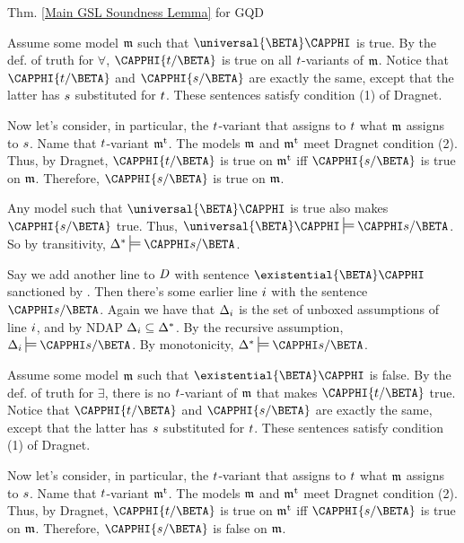 \begin{PROOFOF}{Thm. \ref{Main GSL Soundness Lemma} for GQD}
\begin{description}
\begin{description}
Assume some model $\mathfrak{m}$ such that $\universal{\BETA}\CAPPHI$ is true.  By the def. of truth for $\forall$, $\CAPPHI{\variable{t}/\BETA}$ is true on all $t$-variants of $\mathfrak{m}$.  Notice that $\CAPPHI{\variable{t}/\BETA}$ and $\CAPPHI{\variable{s}/\BETA}$ are exactly the same, except that the latter has $s$ substituted for $t$.  These sentences satisfy condition (1) of Dragnet.

Now let's consider, in particular, the $t$-variant that assigns to $t$ what $\mathfrak{m}$ assigns to $s$.  Name that $t$-variant $\mathfrak{m^{\mathrm{t}}_{\mathrm{}}}$.  The models $\mathfrak{m}$ and $\mathfrak{m^{\mathrm{t}}_{\mathrm{}}}$ meet Dragnet condition (2).  Thus, by Dragnet, $\CAPPHI{\variable{t}/\BETA}$ is true on $\mathfrak{m^{\mathrm{t}}_{\mathrm{}}}$ iff $\CAPPHI{\variable{s}/\BETA}$ is true on $\mathfrak{m}$.  Therefore, $\CAPPHI{\variable{s}/\BETA}$ is true on $\mathfrak{m}$.

Any model such that $\universal{\BETA}\CAPPHI$ is true also makes $\CAPPHI{\variable{s}/\BETA}$ true.  Thus, $\universal{\BETA}\CAPPHI\sdtstile{}{}\CAPPHI\variable{s}/\BETA$.  So by transitivity, $\Delta^*\sdtstile{}{}\CAPPHI\variable{s}/\BETA$.   

\item[\Rule{$\exists$-Intro}:]
Say we add another line to $\mathit{D}$ with sentence $\existential{\BETA}\CAPPHI$ sanctioned by .
Then there's some earlier line $i$ with the sentence $\CAPPHI\variable{s}/\BETA$.
Again we have that $\Delta_{i}$ is the set of unboxed assumptions of line $i$, and by NDAP $\Delta_{i}\subseteq\Delta^*$.
By the recursive assumption, $\Delta_{\integer{i}}\sdtstile{}{}\CAPPHI\variable{s}/\BETA$.
By monotonicity, $\Delta^*\sdtstile{}{}\CAPPHI\variable{s}/\BETA$.

Assume some model $\mathfrak{m}$ such that $\existential{\BETA}\CAPPHI$ is false.  By the def. of truth for $\exists$, there is no $t$-variant of $\mathfrak{m}$ that makes $\CAPPHI{\variable{t}/\BETA}$ true.  Notice that $\CAPPHI{\variable{t}/\BETA}$ and $\CAPPHI{\variable{s}/\BETA}$ are exactly the same, except that the latter has $s$ substituted for $t$.  These sentences satisfy condition (1) of Dragnet.

Now let's consider, in particular, the $t$-variant that assigns to $t$ what $\mathfrak{m}$ assigns to $s$.  Name that $t$-variant $\mathfrak{m^{\mathrm{t}}_{\mathrm{}}}$.  The models $\mathfrak{m}$ and $\mathfrak{m^{\mathrm{t}}_{\mathrm{}}}$ meet Dragnet condition (2).  Thus, by Dragnet, $\CAPPHI{\variable{t}/\BETA}$ is true on $\mathfrak{m^{\mathrm{t}}_{\mathrm{}}}$ iff $\CAPPHI{\variable{s}/\BETA}$ is true on $\mathfrak{m}$.  Therefore, $\CAPPHI{\variable{s}/\BETA}$ is false on $\mathfrak{m}$.


\end{description}
\end{description}
\end{PROOFOF}
